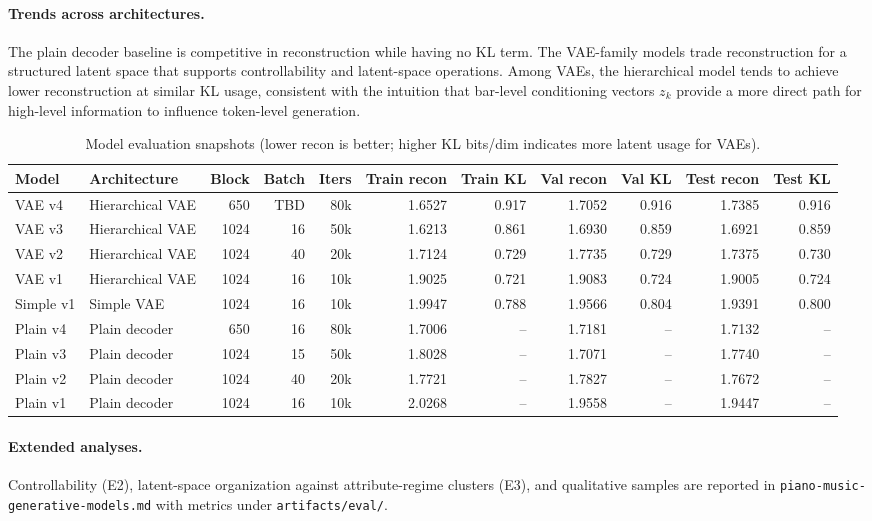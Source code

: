 \documentclass[10pt]{article}
\begin{document}
\paragraph{Trends across architectures.}
The plain decoder baseline is competitive in reconstruction while having no KL term. The VAE-family models trade reconstruction for a structured latent space that supports controllability and latent-space operations. Among VAEs, the hierarchical model tends to achieve lower reconstruction at similar KL usage, consistent with the intuition that bar-level conditioning vectors $z_k$ provide a more direct path for high-level information to influence token-level generation.

\begin{table}[t]
\caption{Model evaluation snapshots (lower recon is better; higher KL bits/dim indicates more latent usage for VAEs).}
\label{tab:snapshots}
\centering
\small
\begin{tabular}{l l r r r r r r r r r}
\toprule
Model & Architecture & Block & Batch & Iters & Train recon & Train KL & Val recon & Val KL & Test recon & Test KL \\
\midrule
VAE v4 & Hierarchical VAE & 650 & TBD & 80k & 1.6527 & 0.917 & 1.7052 & 0.916 & 1.7385 & 0.916 \\
VAE v3 & Hierarchical VAE & 1024 & 16 & 50k & 1.6213 & 0.861 & 1.6930 & 0.859 & 1.6921 & 0.859 \\
VAE v2 & Hierarchical VAE & 1024 & 40 & 20k & 1.7124 & 0.729 & 1.7735 & 0.729 & 1.7375 & 0.730 \\
VAE v1 & Hierarchical VAE & 1024 & 16 & 10k & 1.9025 & 0.721 & 1.9083 & 0.724 & 1.9005 & 0.724 \\
Simple v1 & Simple VAE & 1024 & 16 & 10k & 1.9947 & 0.788 & 1.9566 & 0.804 & 1.9391 & 0.800 \\
Plain v4 & Plain decoder & 650 & 16 & 80k & 1.7006 & -- & 1.7181 & -- & 1.7132 & -- \\
Plain v3 & Plain decoder & 1024 & 15 & 50k & 1.8028 & -- & 1.7071 & -- & 1.7740 & -- \\
Plain v2 & Plain decoder & 1024 & 40 & 20k & 1.7721 & -- & 1.7827 & -- & 1.7672 & -- \\
Plain v1 & Plain decoder & 1024 & 16 & 10k & 2.0268 & -- & 1.9558 & -- & 1.9447 & -- \\
\bottomrule
\end{tabular}
\end{table}

\paragraph{Extended analyses.}
Controllability (E2), latent-space organization against attribute-regime clusters (E3), and qualitative samples are reported in \texttt{piano-music-generative-models.md} with metrics under \texttt{artifacts/eval/}.
\end{document}
